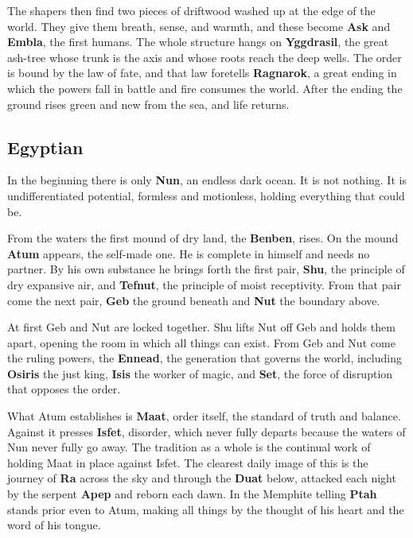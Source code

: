 The shapers then find two pieces of driftwood washed up at the edge of the world.
They give them breath, sense, and warmth, and these become \textbf{Ask} and
\textbf{Embla}, the first humans. The whole structure hangs on \textbf{Yggdrasil},
the great ash-tree whose trunk is the axis and whose roots reach the deep wells.
The order is bound by the law of fate, and that law foretells \textbf{Ragnarok},
a great ending in which the powers fall in battle and fire consumes the world.
After the ending the ground rises green and new from the sea, and life returns.

\subsection{Egyptian}

In the beginning there is only \textbf{Nun}, an endless dark ocean. It is not
nothing. It is undifferentiated potential, formless and motionless, holding
everything that could be.

From the waters the first mound of dry land, the \textbf{Benben}, rises. On the
mound \textbf{Atum} appears, the self-made one. He is complete in himself and
needs no partner. By his own substance he brings forth the first pair,
\textbf{Shu}, the principle of dry expansive air, and \textbf{Tefnut}, the
principle of moist receptivity. From that pair come the next pair, \textbf{Geb}
the ground beneath and \textbf{Nut} the boundary above.

At first Geb and Nut are locked together. Shu lifts Nut off Geb and holds them
apart, opening the room in which all things can exist. From Geb and Nut come the
ruling powers, the \textbf{Ennead}, the generation that governs the world,
including \textbf{Osiris} the just king, \textbf{Isis} the worker of magic, and
\textbf{Set}, the force of disruption that opposes the order.

What Atum establishes is \textbf{Maat}, order itself, the standard of truth and
balance. Against it presses \textbf{Isfet}, disorder, which never fully departs
because the waters of Nun never fully go away. The tradition as a whole is the
continual work of holding Maat in place against Isfet. The clearest daily image
of this is the journey of \textbf{Ra} across the sky and through the \textbf{Duat}
below, attacked each night by the serpent \textbf{Apep} and reborn each dawn. In
the Memphite telling \textbf{Ptah} stands prior even to Atum, making all things
by the thought of his heart and the word of his tongue.

